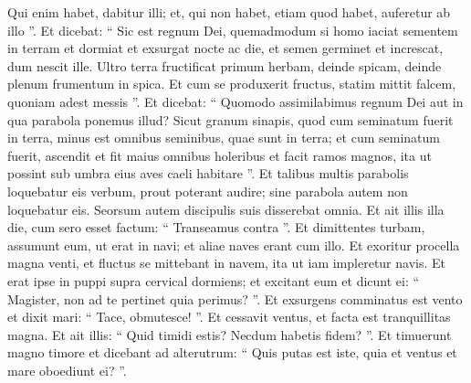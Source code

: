 \begin{biblechapter}
\begin{biblechapter}
\begin{biblechapter}
\begin{biblechapter}
\verse Qui enim habet, dabitur illi; et, qui non habet, etiam quod habet, auferetur ab illo ”.
 \verse Et dicebat: “ Sic est regnum Dei, quemadmodum si homo iaciat sementem in terram 
\verse et dormiat et exsurgat nocte ac die, et semen germinet et increscat, dum nescit ille. 
\verse Ultro terra fructificat primum herbam, deinde spicam, deinde plenum frumentum in spica. 
\verse Et cum se produxerit fructus, statim mittit falcem, quoniam adest messis ”.
 \verse Et dicebat: “ Quomodo assimilabimus regnum Dei aut in qua parabola ponemus illud? 
\verse Sicut granum sinapis, quod cum seminatum fuerit in terra, minus est omnibus seminibus, quae sunt in terra; 
\verse et cum seminatum fuerit, ascendit et fit maius omnibus holeribus et facit ramos magnos, ita ut possint sub umbra eius aves caeli habitare ”.
 \verse Et talibus multis parabolis loquebatur eis verbum, prout poterant audire; 
 \verse sine parabola autem non loquebatur eis. Seorsum autem discipulis suis disserebat omnia.
 \verse Et ait illis illa die, cum sero esset factum: “ Transeamus contra ”. 
\verse Et dimittentes turbam, assumunt eum, ut erat in navi; et aliae naves erant cum illo. 
\verse Et exoritur procella magna venti, et fluctus se mittebant in navem, ita ut iam impleretur navis. 
\verse Et erat ipse in puppi supra cervical dormiens; et excitant eum et dicunt ei: “ Magister, non ad te pertinet quia perimus? ”. 
\verse Et exsurgens comminatus est vento et dixit mari: “ Tace, obmutesce! ”. Et cessavit ventus, et facta est tranquillitas magna. 
\verse Et ait illis: “ Quid timidi estis? Necdum habetis fidem? ”. 
\verse Et timuerunt magno timore et dicebant ad alterutrum: “ Quis putas est iste, quia et ventus et mare oboediunt ei? ”.
 

\end{biblechapter}
\end{biblechapter}
\end{biblechapter}
\end{biblechapter}
